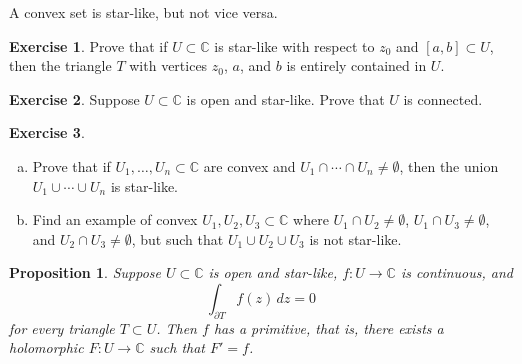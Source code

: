 \documentclass[12pt,openany]{book}
\newcommand{\C}{{\mathbb{C}}}
\theoremstyle{plain}
\newtheorem{prop}[thm]{Proposition}
\theoremstyle{remark}
\theoremstyle{definition}
\newenvironment{exbox}{%
    \def\FrameCommand{\vrule width 1pt \relax\hspace{10pt}}%
    \MakeFramed{\advance\hsize-\width\FrameRestore}%
}{%
    \endMakeFramed
}
\newenvironment{exparts}{%
    \leavevmode\begin{enumerate}[a),noitemsep,topsep=0pt,parsep=0pt,partopsep=0pt]
}{%
    \end{enumerate}
}
\theoremstyle{exercise}
\newtheorem{exercise}{Exercise}[section]
\theoremstyle{example}
\begin{document}
A convex set is star-like, but not vice versa.

\begin{exbox}
\begin{exercise}%
\label{exercise:triangleinstarlike}
Prove that if $U \subset \C$ is star-like with respect to $z_0$ and $[a,b]
\subset U$, then the triangle $T$ with vertices $z_0$, $a$, and $b$ is entirely
contained in $U$.
\end{exercise}

\begin{exercise}
Suppose $U \subset \C$ is open and star-like.  Prove that $U$ is connected.
\end{exercise}

\begin{exercise}
\begin{exparts}
\item
Prove that if $U_1,\ldots,U_n \subset \C$ are convex and $U_1 \cap 
\cdots \cap U_n \not= \emptyset$, then the union $U_1 \cup \cdots \cup U_n$
is star-like.
\item
Find an example of convex $U_1,U_2,U_3 \subset \C$ where
$U_1 \cap U_2 \not= \emptyset$,
$U_1 \cap U_3 \not= \emptyset$, and
$U_2 \cap U_3 \not= \emptyset$, but such that $U_1 \cup U_2 \cup U_3$
is not star-like.
\end{exparts}
\end{exercise}
\end{exbox}

\begin{prop} \label{prop:primitiveinstarlike1}
Suppose $U \subset \C$ is open and star-like,
$f \colon U \to \C$ is continuous, and
\begin{equation*}
\int_{\partial T} f(z) \, dz = 0
\end{equation*}
for every triangle $T \subset U$.
Then $f$ has a primitive, that is,
there exists a holomorphic $F \colon U \to \C$
such that $F' = f$.
\end{prop}
\end{document}
